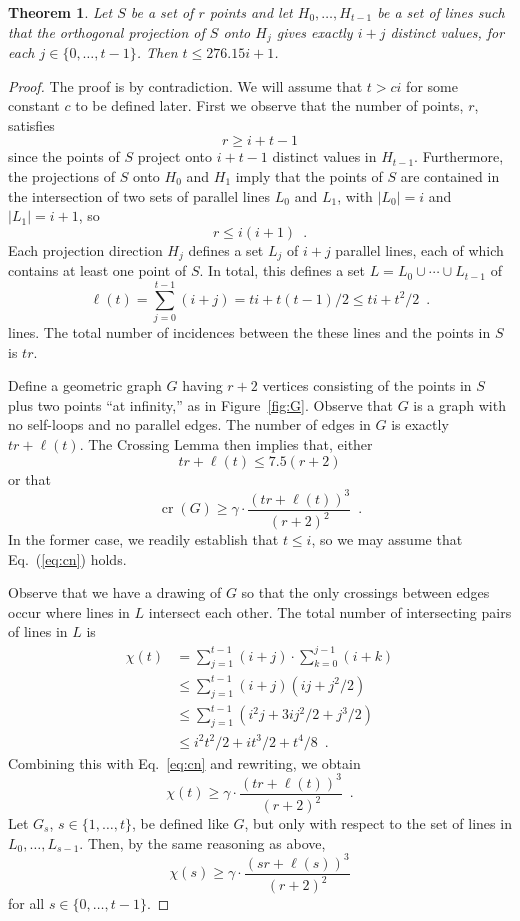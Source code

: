 \documentclass[12pt]{article}
\newtheorem{thm}{Theorem}
\DeclareMathOperator{\cn}{cr}
\begin{document}
\begin{thm}
Let $S$ be a set of $r$ points and let $H_0,\ldots,H_{t-1}$ be a
set of lines such that the orthogonal projection of $S$ onto $H_{j}$
gives exactly $i+j$ distinct values, for each $j\in\{0,\ldots,t-1\}$.
Then $t \le 276.15i+1$.
\end{thm}

\begin{proof}
The proof is by contradiction.  We will assume that $t > ci$ for some
constant $c$ to be defined later.
First we observe that the number of points, $r$, satisfies 
\[   r \ge i+t-1 
\]
since the points of $S$ project onto $i+t-1$ distinct values in $H_{t-1}$.
Furthermore, the projections of $S$ onto $H_0$ and $H_1$ imply that the
points of $S$ are contained in the intersection of two sets of parallel
lines $L_0$ and $L_1$, with $|L_0|=i$ and $|L_1|=i+1$, so
\[
   r \le i(i+1) \enspace .
\]
Each projection direction $H_j$ defines a set $L_j$ of $i+j$ parallel lines,
each of which contains at least one point of $S$.  In total, this defines
a set $L=L_0\cup\cdots\cup L_{t-1}$ of
\[
   \ell(t) = \sum_{j=0}^{t-1} (i+j) = ti + t(t-1)/2 \le ti + t^2/2 \enspace .
\]
lines.  The total number of incidences between the these lines and
the points in $S$ is $tr$.

Define a geometric graph $G$ having $r+2$ vertices consisting
of the points in $S$ plus two points ``at infinity,'' as in
Figure~\ref{fig:G}. Observe that $G$ is a graph with no self-loops and no
parallel edges. The number of
edges in $G$ is exactly $tr + \ell(t)$.
The Crossing Lemma \cite{XX} then implies that, either
\[
  tr +\ell(t) \le 7.5(r+2)
\]
or that
\begin{equation}
  \cn(G) \ge \gamma\cdot\frac{(tr+\ell(t))^3}{(r+2)^2} \enspace . \label{eq:cn}
\end{equation}
In the former case, we readily establish that $t \le i$,
so we may assume that Eq.~(\ref{eq:cn}) holds.

Observe that we have a drawing of $G$ so that the only crossings between
edges occur where lines in $L$ intersect each other.  The total number of
intersecting pairs of lines in $L$ is 
\[
  \begin{aligned}
    \chi(t) 
      & = \sum_{j=1}^{t-1}(i+j)\cdot\sum_{k=0}^{j-1}(i+k) \\
      & \le \sum_{j=1}^{t-1}(i+j)(ij + j^2/2) \\
      & \le \sum_{j=1}^{t-1}(i^2j+3ij^2/2 + j^3/2) \\
      & \le i^2t^2/2 + it^3/2 + t^4/8 \enspace .
  \end{aligned}
\]
Combining this with Eq.~\ref{eq:cn} and rewriting, we obtain 
\[
  \chi(t)  \ge \gamma\cdot\frac{(tr+\ell(t))^3}{(r+2)^2} \enspace .
\]
Let $G_{s}$, $s\in\{1,\ldots,t\}$, be defined like $G$, but only with
respect to the set of lines in $L_0,\ldots,L_{s-1}$.  Then, by the same reasoning as above,
\[
  \chi(s) \ge \gamma\cdot\frac{(sr+\ell(s))^3}{(r+2)^2} 
\]
for all $s\in\{0,\ldots,t-1\}$.


\end{proof}
\end{document}

